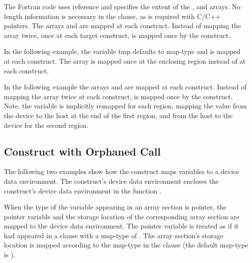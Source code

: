 

The Fortran code uses reference and specifies the extent of the ,  and  arrays. 
No length information is necessary in the  clause, as is required with 
C/C++ pointers. The arrays  and  are mapped at each  construct. 
Instead of mapping the array  twice, once at each target construct,  is mapped 
once by the   construct.


In the following example, the variable tmp defaults to  map-type 
and is mapped at each  construct. The array  is mapped once at 
the enclosing   region instead of at each  
construct. 


In the following example the arrays  and  are mapped at each  
construct. Instead of mapping the array  twice at each  construct, 
 is mapped once by the   construct. Note, the  
variable is implicitly remapped for each  region, mapping the value 
from the device to the host at the end of the first  region, and 
from the host to the device for the second  region.


\subsection{  Construct with Orphaned Call}

The following two examples show how the   construct 
maps variables to a device data environment. The   
construct's device data environment encloses the  construct's device 
data environment in the function .

When the type of the variable appearing in an array section is pointer, the pointer 
variable and the storage location of the corresponding array section are mapped 
to the device data environment. The pointer variable is treated as if it had appeared 
in a  clause with a map-type of . The array section's 
storage location is mapped according to the map-type in the  clause 
(the default map-type is ).

